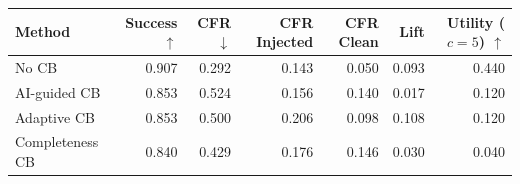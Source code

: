 \begin{tabular}{lrrrrrr}
\toprule
Method & Success $\uparrow$ & CFR $\downarrow$ & CFR Injected & CFR Clean & Lift & Utility ($c=5$) $\uparrow$ \\
\midrule
No CB & 0.907 & 0.292 & 0.143 & 0.050 & 0.093 & 0.440 \\
AI-guided CB & 0.853 & 0.524 & 0.156 & 0.140 & 0.017 & 0.120 \\
Adaptive CB & 0.853 & 0.500 & 0.206 & 0.098 & 0.108 & 0.120 \\
Completeness CB & 0.840 & 0.429 & 0.176 & 0.146 & 0.030 & 0.040 \\
\bottomrule
\end{tabular}

